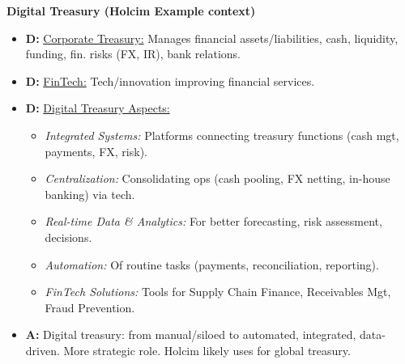 \documentclass[7pt,landscape]{extarticle} %
\newcommand{\cheatsheetsubsubsection}[1]{%
  \vspace{0.15ex plus 0.05ex minus 0.05ex}%
  \noindent\textbf{\sffamily\scriptsize #1}%
  \par\vspace{0.05ex}%
}
\newcommand{\D}[1]{\textbf{\textcolor{DefColor}{D:}} \uline{#1}}
\newcommand{\A}[1]{\textbf{\textcolor{AppColor}{A:}} #1}
\begin{document}
\begin{multicols*}{4}
  \cheatsheetsubsubsection{Digital Treasury (Holcim Example context)}
  \begin{itemize}
    \item \D{Corporate Treasury:} Manages financial assets/liabilities, cash, liquidity, funding, fin. risks (FX, IR), bank relations.
    \item \D{FinTech:} Tech/innovation improving financial services.
    \item \D{Digital Treasury Aspects:}
          \begin{itemize}
            \item \emph{Integrated Systems:} Platforms connecting treasury functions (cash mgt, payments, FX, risk).
            \item \emph{Centralization:} Consolidating ops (cash pooling, FX netting, in-house banking) via tech.
            \item \emph{Real-time Data \& Analytics:} For better forecasting, risk assessment, decisions.
            \item \emph{Automation:} Of routine tasks (payments, reconciliation, reporting).
            \item \emph{FinTech Solutions:} Tools for Supply Chain Finance, Receivables Mgt, Fraud Prevention.
          \end{itemize}
    \item \A{Digital treasury: from manual/siloed to automated, integrated, data-driven. More strategic role. Holcim likely uses for global treasury.}
  \end{itemize}

\end{multicols*}
\end{document}
